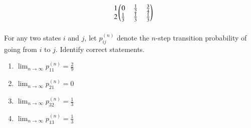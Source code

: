 \begin{enumerate}[label=\thesection.\arabic*.,ref=\thesection.\theenumi]
\begin{align}
\begin{blockarray}{c@{\hspace{1pt}}rrr@{\hspace{3pt}}}
\begin{block}{r@{\hspace{3pt}}@{\hspace{1pt}}
    (@{\hspace{1pt}}rrr@{\hspace{1pt}}@{\hspace{1pt}})}
        1 & 0 &\frac{1}{2}  & \frac{3}{4}  \\
%
        2 &  \frac{1}{3} & \frac{1}{3} & \frac{1}{3}  \\
        \end{block}
    \end{blockarray}
\end{align}
For any two states $i$ and $j$, let $p_{ij}^{(n)}$ denote the $n$-step transition probability of going from $i$ to $j$.  Identify correct statements.
\begin{enumerate}
\item $\lim_{n \to \infty} p_{11}^{(n)} = \frac{2}{9}$
\item $\lim_{n \to \infty} p_{21}^{(n)} = 0$
\item $\lim_{n \to \infty} p_{32}^{(n)} = \frac{1}{3}$
\item $\lim_{n \to \infty} p_{13}^{(n)} = \frac{1}{3}$
\end{enumerate}
\solution


\end{enumerate}
